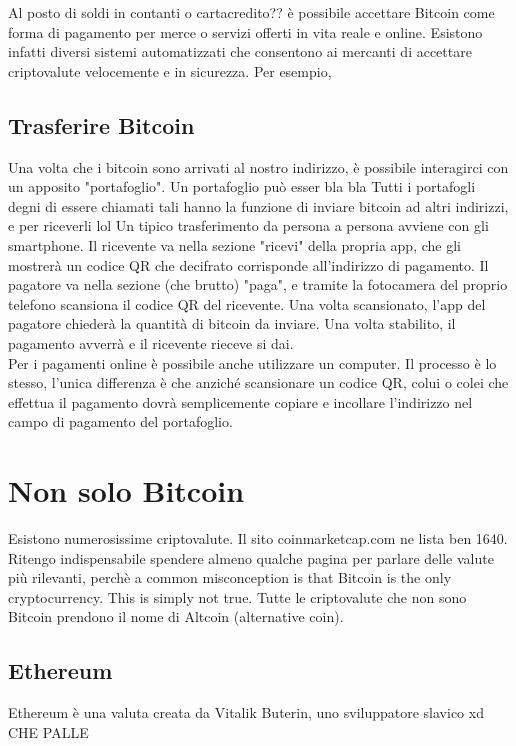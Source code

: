 \documentclass {article}
\begin{document}
Al posto di soldi in contanti o cartacredito?? è possibile accettare Bitcoin come forma di pagamento per merce o servizi offerti in vita reale e online.
Esistono infatti diversi sistemi automatizzati che consentono ai mercanti di accettare criptovalute velocemente e in sicurezza.
Per esempio, 


\subsection {Trasferire Bitcoin}


Una volta che i bitcoin sono arrivati al nostro indirizzo, è possibile interagirci con un apposito "portafoglio". Un portafoglio può esser bla bla
Tutti i portafogli degni di essere chiamati tali hanno la funzione di inviare bitcoin ad altri indirizzi, e per riceverli lol
Un tipico trasferimento da persona a persona avviene con gli smartphone.
Il ricevente va nella sezione "ricevi" della propria app, che gli mostrerà un codice QR che decifrato corrisponde all'indirizzo di pagamento.
Il pagatore va nella sezione (che brutto) "paga", e tramite la fotocamera del proprio telefono scansiona il codice QR del ricevente.
Una volta scansionato, l'app del pagatore chiederà la quantità di bitcoin da inviare. Una volta stabilito, il pagamento avverrà e il ricevente rieceve si dai.
\\
Per i pagamenti online è possibile anche utilizzare un computer. Il processo è lo stesso, l'unica differenza è che anziché scansionare un codice QR, colui o colei che effettua il pagamento dovrà semplicemente copiare e incollare l'indirizzo nel campo di pagamento del portafoglio.


\section {Non solo Bitcoin}


Esistono numerosissime criptovalute. Il sito coinmarketcap.com ne lista ben 1640. Ritengo indispensabile spendere almeno qualche pagina per parlare delle valute più rilevanti, perchè a common misconception is that Bitcoin is the only cryptocurrency. This is simply not true. Tutte le criptovalute che non sono Bitcoin prendono il nome di Altcoin (alternative coin).


\subsection {Ethereum}


Ethereum è una valuta creata da Vitalik Buterin, uno sviluppatore slavico xd CHE PALLE
\end{document}
